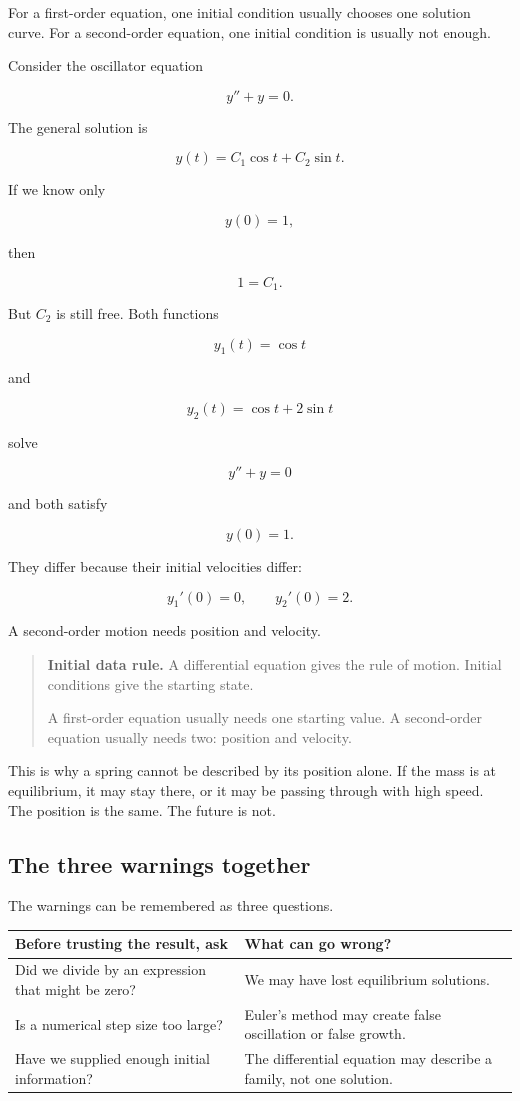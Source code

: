 For a first-order equation, one initial condition usually chooses one solution curve.
For a second-order equation, one initial condition is usually not enough.

Consider the oscillator equation

\[
y''+y=0.
\]

The general solution is

\[
y(t)=C_1\cos t+C_2\sin t.
\]

If we know only

\[
y(0)=1,
\]

then

\[
1=C_1.
\]

But \(C_2\) is still free.  Both functions

\[
y_1(t)=\cos t
\]

and

\[
y_2(t)=\cos t+2\sin t
\]

solve

\[
y''+y=0
\]

and both satisfy

\[
y(0)=1.
\]

They differ because their initial velocities differ:

\[
y_1'(0)=0,
\qquad
y_2'(0)=2.
\]

A second-order motion needs position and velocity.

\begin{quote}
\textbf{Initial data rule.}
A differential equation gives the rule of motion.  Initial conditions give the starting
state.

A first-order equation usually needs one starting value.  A second-order equation
usually needs two: position and velocity.
\end{quote}

This is why a spring cannot be described by its position alone.  If the mass is at
equilibrium, it may stay there, or it may be passing through with high speed.  The
position is the same.  The future is not.

\subsection{The three warnings together}
\label{subsec:three-warnings-together}

The warnings can be remembered as three questions.

\begin{center}
\begin{tabular}{p{}|p{}}
\textbf{Before trusting the result, ask} & \textbf{What can go wrong?} \\ \hline
Did we divide by an expression that might be zero? &
We may have lost equilibrium solutions. \\[4pt]
Is a numerical step size too large? &
Euler's method may create false oscillation or false growth. \\[4pt]
Have we supplied enough initial information? &
The differential equation may describe a family, not one solution.
\end{tabular}
\end{center}

